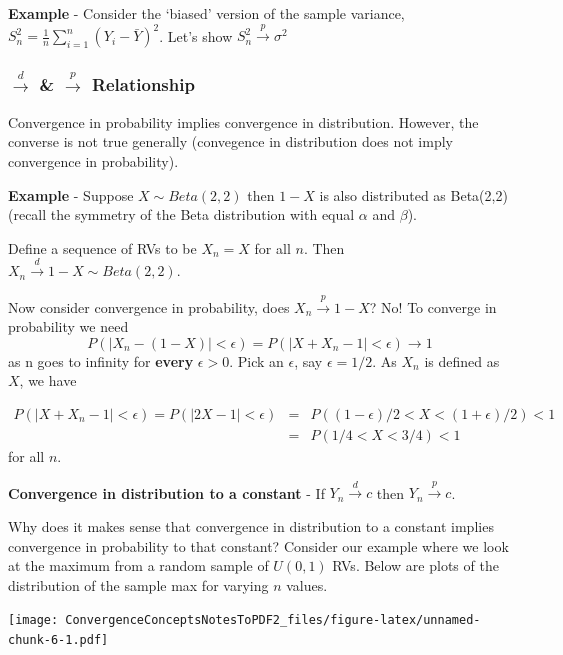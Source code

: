 \documentclass[
]{article}
\begin{document}
\textbf{Example} - Consider the `biased' version of the sample variance,
\(S_n^2=\frac{1}{n}\sum_{i=1}^{n}(Y_i-\bar{Y})^2\). Let's show
\(S_n^2\stackrel{p}{\rightarrow}\sigma^2\)

\hypertarget{stackreldrightarrow-stackrelprightarrow-relationship}{%
\subsubsection{\texorpdfstring{\(\stackrel{d}\rightarrow\) \&
\(\stackrel{p}\rightarrow\)
Relationship}{\textbackslash stackrel\{d\}\textbackslash rightarrow \& \textbackslash stackrel\{p\}\textbackslash rightarrow Relationship}}\label{stackreldrightarrow-stackrelprightarrow-relationship}}

Convergence in probability implies convergence in distribution. However,
the converse is not true generally (convegence in distribution does not
imply convergence in probability).

\textbf{Example} - Suppose \(X\sim Beta(2,2)\) then \(1-X\) is also
distributed as Beta(2,2) (recall the symmetry of the Beta distribution
with equal \(\alpha\) and \(\beta\)).

Define a sequence of RVs to be \(X_n=X\) for all \(n\). Then
\(X_n\stackrel{d}{\rightarrow}1-X\sim Beta(2,2)\).

Now consider convergence in probability, does
\(X_n\stackrel{p}{\rightarrow}1-X\)? No! To converge in probability we
need \[P(|X_n-(1-X)|<\epsilon)=P(|X+X_n-1|<\epsilon)\rightarrow 1\] as n
goes to infinity for \textbf{every} \(\epsilon>0\). Pick an
\(\epsilon\), say \(\epsilon = 1/2\). As \(X_n\) is defined as \(X\), we
have

\begin{eqnarray*}
P(|X+X_n-1|<\epsilon)=P(|2X-1|<\epsilon) & = & P((1-\epsilon)/2 < X < (1+\epsilon)/2) < 1\\
                     &= &P(1/4 < X < 3/4) <1
\end{eqnarray*} for all \(n\).

\textbf{Convergence in distribution to a constant} - If
\(Y_n\stackrel{d}{\rightarrow}c\) then \(Y_n\stackrel{p}\rightarrow c\).

Why does it makes sense that convergence in distribution to a constant
implies convergence in probability to that constant? Consider our
example where we look at the maximum from a random sample of \(U(0,1)\)
RVs. Below are plots of the distribution of the sample max for varying
\(n\) values.

\texttt{[image: ConvergenceConceptsNotesToPDF2\_files/figure-latex/unnamed-chunk-6-1.pdf]}
\end{document}
